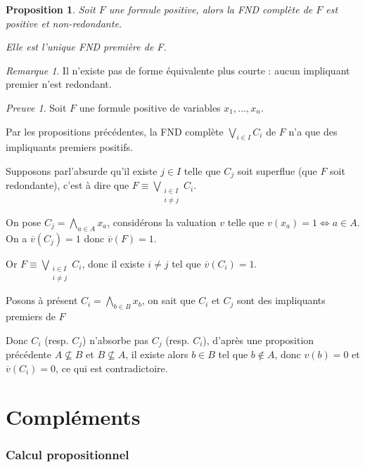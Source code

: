 \documentclass[]{article}
\newtheorem{myproposition}{Proposition}
\theoremstyle{remark}
\newtheorem{myrem}{Remarque}
\newtheorem{myproof}{Preuve}
\theoremstyle{definition}
\begin{document}
\begin{myproposition}
	Soit $F$ une formule positive, alors la FND complète de $F$ est positive et non-redondante.
	
	Elle est l'unique FND première de F.
\end{myproposition}

\begin{myrem}
	Il n'existe pas de forme équivalente plus courte : aucun impliquant premier n'est redondant.
\end{myrem}

\begin{myproof}
	Soit $F$ une formule positive de variables $x_1, ..., x_n$.
	
	Par les propositions précédentes, la FND complète $\displaystyle \bigvee_{i \in I} C_i$ de $F$ n'a que des impliquants premiers positifs.
	
	Supposons parl'absurde qu'il existe $j \in I$ telle que $C_j$ soit superflue (que $F$ soit redondante), c'est à dire que $\displaystyle F \equiv \bigvee_{\substack{i \in I \\ i \neq j}} C_i$.
	
	On pose $\displaystyle C_j = \bigwedge_{a \in A} x_a$, considérons la valuation $v$ telle que $v(x_a) = 1 \Longleftrightarrow a \in A$. On a $\overline{v}(C_j) = 1$ donc $\overline{v}(F)=1$.
	
	Or $\displaystyle F \equiv \bigvee_{\substack{i \in I \\ i \neq j}} C_i$, donc il existe $i \neq j$ tel que $\overline{v}(C_i) = 1$.
	
	Posons à présent $\displaystyle C_i = \bigwedge_{b \in B} x_b$, on sait que $C_i$ et $C_j$ sont des impliquants premiers de $F$
	
	Donc $C_i$ (resp. $C_j$) n'absorbe pas $C_j$ (resp. $C_i$), d'après une proposition précédente $A \not\subseteq B$ et $B \not\subseteq A$, il existe alors $b \in B$ tel que $b \notin A$, donc $v(b) = 0$ et $\overline{v}(C_i)=0$, ce qui est contradictoire.
\end{myproof}

\part{Compléments}

\section{Calcul propositionnel}
\end{document}

